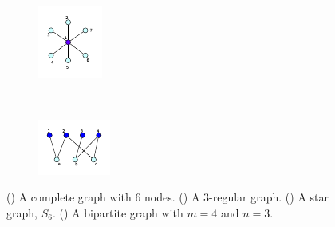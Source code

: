 \documentclass[10pt,a4paper]{article}
\theoremstyle{plain}
\theoremstyle{definition}
\begin{document}
\begin{figure}[H]
\begin{subfigure}[b]{0.19\textwidth}
		\caption{}
		\label{regular}
	\end{subfigure}
	~
	\begin{subfigure}[b]{0.20\textwidth}
		\includegraphics[width=\textwidth]{images/star.pdf}
		\caption{}
		\label{star-graph}
	\end{subfigure} ~
    \begin{subfigure}[b]{0.24\textwidth}
    	\includegraphics[width=\textwidth]{images/bipartite-graph.pdf}
    	\caption{}
    	\label{bipartite}
    \end{subfigure}
	\caption{ () A complete graph with $6$ nodes. () A $3$-regular graph. () A star graph, $S_6$. () A bipartite graph with $m=4$ and $n=3$.}
	\label{fig:compreggraphs}
\end{figure}
\end{document}
